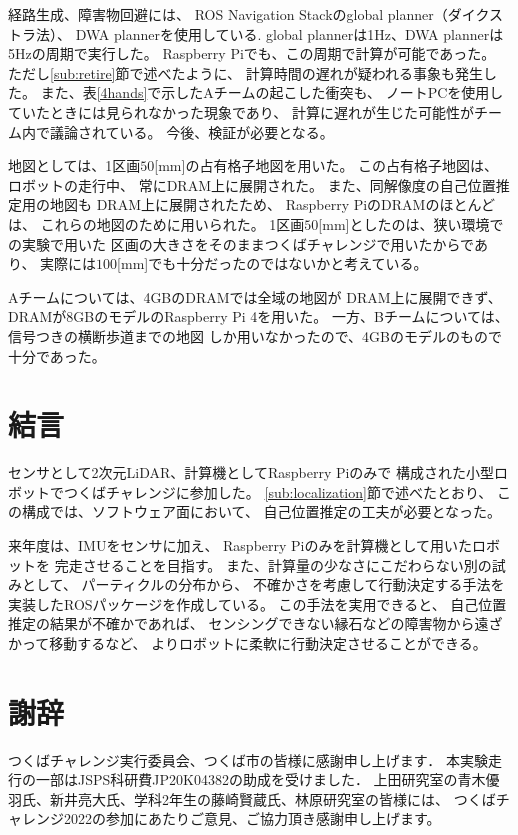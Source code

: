 \documentclass[twocolumn,9pt]{jsproceedings}
\begin{document}
経路生成、障害物回避には、
ROS Navigation Stackのglobal planner（ダイクストラ法）、
DWA plannerを使用している. 
global plannerは1Hz、DWA plannerは5Hzの周期で実行した。
Raspberry Piでも、この周期で計算が可能であった。
ただし\ref{sub:retire}節で述べたように、
計算時間の遅れが疑われる事象も発生した。
また、表\ref{4hands}で示したAチームの起こした衝突も、
ノートPCを使用していたときには見られなかった現象であり、
計算に遅れが生じた可能性がチーム内で議論されている。
今後、検証が必要となる。


地図としては、1区画$50$[mm]の占有格子地図を用いた。
この占有格子地図は、ロボットの走行中、
常にDRAM上に展開された。
また、同解像度の自己位置推定用の地図も
DRAM上に展開されたため、
Raspberry PiのDRAMのほとんどは、
これらの地図のために用いられた。
1区画$50$[mm]としたのは、狭い環境での実験で用いた
区画の大きさをそのままつくばチャレンジで用いたからであり、
実際には$100$[mm]でも十分だったのではないかと考えている。

Aチームについては、4GBのDRAMでは全域の地図が
DRAM上に展開できず、DRAMが8GBのモデルのRaspberry Pi 4を用いた。
一方、Bチームについては、信号つきの横断歩道までの地図
しか用いなかったので、4GBのモデルのもので十分であった。


\section{結言}

センサとして2次元LiDAR、計算機としてRaspberry Piのみで
構成された小型ロボットでつくばチャレンジに参加した。
\ref{sub:localization}節で述べたとおり、
この構成では、ソフトウェア面において、
自己位置推定の工夫が必要となった。

来年度は、IMUをセンサに加え、
Raspberry Piのみを計算機として用いたロボットを
完走させることを目指す。
また、計算量の少なさにこだわらない別の試みとして、
パーティクルの分布から、
不確かさを考慮して行動決定する手法を
実装したROSパッケージを作成している\cite{pfc}。
この手法を実用できると、
自己位置推定の結果が不確かであれば、
センシングできない縁石などの障害物から遠ざかって移動するなど、
よりロボットに柔軟に行動決定させることができる。


\section*{謝辞}

つくばチャレンジ実行委員会、つくば市の皆様に感謝申し上げます．
本実験走行の一部はJSPS科研費JP20K04382の助成を受けました．
上田研究室の青木優羽氏、新井亮大氏、学科2年生の藤崎賢蔵氏、林原研究室の皆様には、
つくばチャレンジ2022の参加にあたりご意見、ご協力頂き感謝申し上げます。
\end{document}
